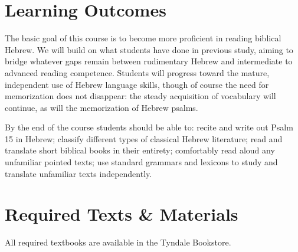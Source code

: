 \documentclass[titlepage]{article}
\newcommand\incl{../includes}
\begin{document}


\section{Learning Outcomes}
\label{outcomes}

The basic goal of this course is to become more proficient in reading
biblical Hebrew. We will build on what students have done in previous
study, aiming to bridge whatever gaps remain between rudimentary Hebrew
and intermediate to advanced reading competence. Students will progress
toward the mature, independent use of Hebrew language skills, though of
course the need for memorization does not disappear: the steady
acquisition of vocabulary will continue, as will the memorization of
Hebrew psalms.

By the end of the course students should be able to:
	recite and write out Psalm 15 in Hebrew;
	classify different types of classical Hebrew literature;
	read and translate short biblical books in their entirety;
	comfortably read aloud any unfamiliar pointed texts;
	use standard grammars and lexicons to study and translate unfamiliar texts independently.

\section{Required Texts \& Materials}
\label{texts}

All required textbooks are available in the Tyndale Bookstore.
\end{document}
